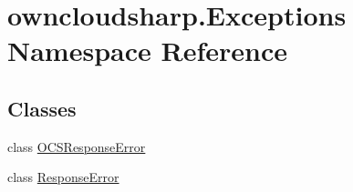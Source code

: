 \hypertarget{namespaceowncloudsharp_1_1_exceptions}{}\section{owncloudsharp.\+Exceptions Namespace Reference}
\label{namespaceowncloudsharp_1_1_exceptions}
\subsection*{Classes}
\begin{DoxyCompactItemize}
\item 
class \hyperlink{classowncloudsharp_1_1_exceptions_1_1_o_c_s_response_error}{O\+C\+S\+Response\+Error}
\item 
class \hyperlink{classowncloudsharp_1_1_exceptions_1_1_response_error}{Response\+Error}
\end{DoxyCompactItemize}
